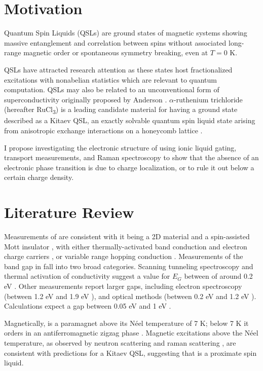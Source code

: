 \documentclass[11pt]{article}
\begin{document}
\section{Motivation}
Quantum Spin Liquids (QSLs) are ground states of magnetic systems showing massive entanglement and correlation between spins without associated long-range magnetic order or spontaneous symmetry breaking, even at $T = 0$ K. 

QSLs have attracted research attention as these states host fractionalized excitations with nonabelian statistics \cite{Balents2010} which are relevant to quantum computation. QSLs may also be related to an unconventional form of superconductivity originally proposed by Anderson \cite{Lee2008}. $\alpha$-ruthenium trichloride (hereafter RuCl\textsubscript{3}) is a leading candidate material for having a ground state described as a Kitaev QSL, an exactly solvable quantum spin liquid state arising from anisotropic exchange interactions on a honeycomb lattice \cite{Kitaev2006}.

I propose investigating the electronic structure of \rucl using ionic liquid gating, transport measurements, and Raman spectroscopy to show that the absence of an electronic phase transition is due to charge localization, or to rule it out below a certain charge density.

\section{Literature Review}
Measurements of \rucl are consistent with it being a 2D material \cite{Kim2015a} and a spin-assisted Mott insulator \cite{Plumb2014}, with either thermally-activated band conduction and electron charge carriers \cite{Rojas1983}, or variable range hopping conduction \cite{Mashhadi2018}. Measurements of the band gap in \rucl fall into two broad categories. Scanning tunneling spectroscopy and thermal activation of conductivity suggest a value for $E_{G}$ between of around 0.2 eV \cite{Binotto1971,Rojas1983,Ziatdinov2016}. Other measurements report larger gaps, including electron spectroscopy (between 1.2 eV and 1.9 eV \cite{Koitzsch2016,Zhou2016,Sinn2016}), and optical methods (between 0.2 eV and 1.2 eV \cite{Reschke2017,Pollini1996,Sandilands2016}). Calculations expect a gap between 0.05 eV and 1 eV  \cite{Sarikurt2017,Kim2015}.

Magnetically, \rucl is a paramagnet above its N{\'e}el temperature of 7 K; below 7 K it orders in an antiferromagnetic zigzag phase \cite{Sears2015}. Magnetic excitations above the N{\'e}el temperature, as observed by neutron scattering and raman scattering \cite{Banerjee2016,Sandilands2015}, are consistent with predictions for a Kitaev QSL, suggesting that \rucl is a proximate spin liquid.
\end{document}
